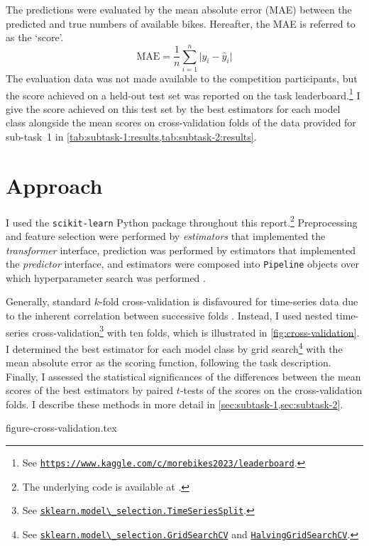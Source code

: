 \documentclass[11pt]{extarticle}
\newcommand{\kaggle}[1]{\href{https://www.kaggle.com/c/morebikes2023/#1}{\lstinline|https://www.kaggle.com/c/morebikes2023/#1|}}
\newcommand{\sklearn}[2]{\href{https://scikit-learn.org/stable/modules/generated/sklearn.#1.#2.html}{\lstinline|sklearn.#1.#2|}}
\newcommand{\skl}[2]{\href{https://scikit-learn.org/stable/modules/generated/sklearn.#1.#2.html}{\lstinline|#2|}}
\begin{document}
The predictions were evaluated by the mean absolute error (MAE) between the predicted
and true numbers of available bikes.
Hereafter, the MAE is referred to as the `score'.
\begin{equation}
  \label{eq:mae}
  \text{MAE} = \frac{1}{n} \sum_{i = 1}^n \lvert y_i - \hat{y}_i \rvert
\end{equation}
The evaluation data was not made available to the competition participants, but the
score achieved on a held-out test set was reported on the task
leaderboard.\footnote{See \kaggle{leaderboard}.
}
I give the score achieved on this test set by the best estimators for each model class
alongside the mean scores on cross-validation folds of the data provided for sub-task~1
in \cref{tab:subtask-1:results,tab:subtask-2:results}.

\section{Approach}
\label{sec:approach}

I used the \texttt{scikit-learn} Python package \parencite{Pedregosa2011} throughout
this report.\footnote{The underlying code is available at
  .
}
Preprocessing and feature selection were performed by \emph{estimators} that
implemented the \emph{transformer} interface, prediction was performed by estimators
that implemented the \emph{predictor} interface, and estimators were composed into
\texttt{Pipeline} objects over which hyperparameter search was performed
\parencite[4-9]{Buitinck2013}.

Generally, standard $k$-fold cross-validation is disfavoured for time-series data due
to the inherent correlation between successive folds \parencite{Bergmeir2018}.
Instead, I used nested time-series cross-validation\footnote{See
  \sklearn{model\_selection}{TimeSeriesSplit}.
} with ten folds, which is illustrated in
\cref{fig:cross-validation}.
I determined the best estimator for each model class by grid search\footnote{See
  \sklearn{model\_selection}{GridSearchCV} and
  \skl{model\_selection}{HalvingGridSearchCV}.
} with the mean absolute error as the scoring function, following the task description.
Finally, I assessed the statistical significances of the differences between the mean
scores of the best estimators by paired $t$-tests of the scores on the cross-validation
folds.
I describe these methods in more detail in \cref{sec:subtask-1,sec:subtask-2}.

{figure-cross-validation.tex}
\end{document}
